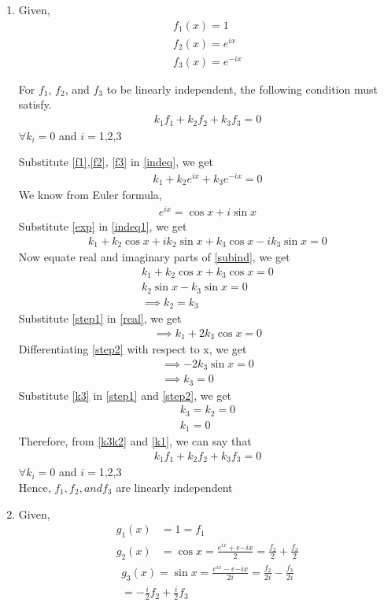 \documentclass[journal,12pt,twocolumn]{IEEEtran}
\begin{document}
\begin{enumerate}
\item
Given,
\begin{align}
    f_1(x)=1\label{f1}\\
    f_2(x)=e^{ix}\label{f2}\\
    f_3(x)=e^{-ix}\label{f3}
\end{align}

For $f_1$, $f_2$, and $f_3$ to be linearly independent, the following condition must satisfy.
\begin{align}
    k_1f_1+k_2f_2+k_3f_3=0\label{indeq}
\end{align}
$\forall k_i=0$ and $i=$1,2,3

Substitute \eqref{f1},\eqref{f2}, \eqref{f3} in \eqref{indeq}, we get
\begin{align}
    k_1+k_2e^{ix}+k_3e^{-ix}=0\label{indeq1}
\end{align}
We know from Euler formula,
\begin{align} 
e^{ix}=\cos{x}+i\sin{x}\label{exp} 
\end{align}
Substitute \eqref{exp} in \eqref{indeq1}, we get
\begin{align}
k_1+k_2\cos{x}+ik_2\sin{x}+k_3\cos{x}-ik_3\sin{x}=0\label{subind}
\end{align}
Now equate real and imaginary parts of \eqref{subind}, we get
\begin{align}
k_1+k_2\cos{x}+k_3\cos{x}=0\label{real}\\
k_2\sin{x}-k_3\sin{x}=0\label{imag}\\
\implies k_2=k_3\label{step1}
\end{align}
Substitute \eqref{step1} in \eqref{real}, we get
\begin{align}
\implies k_1+2k_3\cos{x}=0\label{step2}
\end{align}
Differentiating \eqref{step2} with respect to x, we get
\begin{align}
\implies -2k_3\sin{x}=0\\
\implies k_3=0\label{k3}
\end{align}
Substitute \eqref{k3} in \eqref{step1} and \eqref{step2}, we get 
\begin{align}
    k_3=k_2=0\label{k3k2}\\
    k_1=0\label{k1}
\end{align}
Therefore, from \eqref{k3k2} and \eqref{k1}, we can say that
\begin{align}
    k_1f_1+k_2f_2+k_3f_3=0
\end{align}
$\forall k_i=0$ and $i=$1,2,3\\
Hence, $f_1, f_2, and f_3$ are linearly independent
\item
Given,
\begin{align}
    g_1(x)&=1=f_1\label{g1}\\
    g_2(x)&=\cos{x}=\frac{e^{ix}+e{-ix}}{2}=\frac{f_2}{2}+\frac{f_3}{2}\label{g2}
\end{align}
\begin{multline}
    g_3(x)=\sin{x}=\frac{e^{ix}-e{-ix}}{2i}=\frac{f_2}{2i}-\frac{f_3}{2i}\\=-\frac{i}{2}f_2+\frac{i}{2}f_3\label{g3}
\end{multline}


\end{enumerate}
\end{document}
